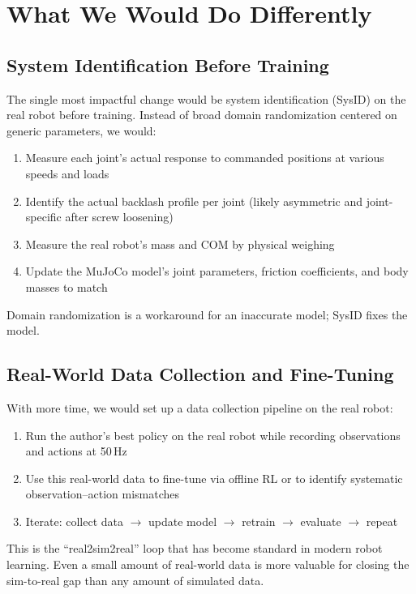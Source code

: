 \documentclass{article}
\begin{document}
\section{What We Would Do Differently}

\subsection{System Identification Before Training}

The single most impactful change would be system identification (SysID) on the real robot before training. Instead of broad domain randomization centered on generic parameters, we would:

\begin{enumerate}[nosep]
  \item Measure each joint's actual response to commanded positions at various speeds and loads
  \item Identify the actual backlash profile per joint (likely asymmetric and joint-specific after screw loosening)
  \item Measure the real robot's mass and COM by physical weighing
  \item Update the MuJoCo model's joint parameters, friction coefficients, and body masses to match
\end{enumerate}

Domain randomization is a workaround for an inaccurate model; SysID fixes the model.

\subsection{Real-World Data Collection and Fine-Tuning}

With more time, we would set up a data collection pipeline on the real robot:

\begin{enumerate}[nosep]
  \item Run the author's best policy on the real robot while recording observations and actions at 50\,Hz
  \item Use this real-world data to fine-tune via offline RL or to identify systematic observation--action mismatches
  \item Iterate: collect data $\rightarrow$ update model $\rightarrow$ retrain $\rightarrow$ evaluate $\rightarrow$ repeat
\end{enumerate}

This is the ``real2sim2real'' loop that has become standard in modern robot learning. Even a small amount of real-world data is more valuable for closing the sim-to-real gap than any amount of simulated data.
\end{document}
